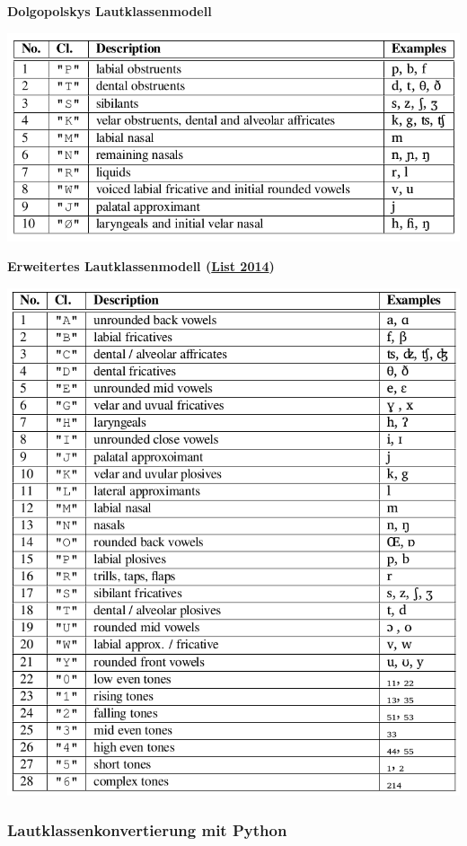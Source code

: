 \par\noindent\textbf{Dolgopolskys Lautklassenmodell}

\includegraphics[width=\textwidth]{img/dolgo.png}



\par\noindent\textbf{Erweitertes Lautklassenmodell
(\href{http://bibliography.lingpy.org?key=List2014d}{List 2014})}

\includegraphics[width=\textwidth]{img/sca.png}


\subsubsection{\texorpdfstring{{Lautklassenkonvertierung mit
Python}}{Lautklassenkonvertierung mit Python}}

